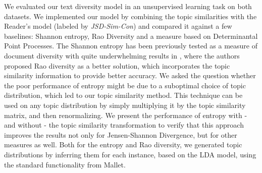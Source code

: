 We evaluated our text diversity model in an unsupervised learning task
on both datasets.
We implemented our model by combining the topic similarities with the
Reader's model (labeled by {\em JSD-Sim-Con}) and compared it against a few
baselines: Shannon entropy, Rao Diversity and a measure
based on Determinantal Point Processes.
The Shannon entropy has
been previously tested as a measure of document diversity with quite
underwhelming results in \cite{bache:2013}, where the authors proposed 
Rao diversity as a better solution, which incorporates the topic similarity
information to provide better accuracy. We asked the question whether
the poor performance of entropy might be due to a suboptimal choice of
topic distribution, which led to our topic similarity
method. This technique can be used on any topic distribution
by simply multiplying it by the topic similarity matrix, and then
renormalizing. We present the performance of entropy with - and
without - the topic
similarity transformation to verify that this approach improves the results not
only for Jensen-Shannon Divergence, but for other measures as well.
Both for the entropy and Rao diversity, we generated topic
distributions by inferring them for each instance, based on the LDA
model, using the standard functionality from Mallet.

